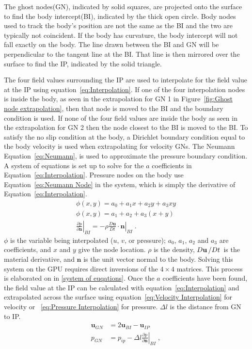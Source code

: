 \documentclass[onehalf,11pt]{beavtex}
\begin{document}
The ghost nodes(GN), indicated by solid squares, are projected onto the surface to find the body intercept(BI), indicated by the thick open circle.
Body nodes used to track the body's position are not the same as the BI and the two are typically not coincident.
If the body has curvature, the body intercept will not fall exactly on the body.
The line drawn between the BI and GN will be perpendicular to the tangent line at the BI.
That line is then mirrored over the surface to find the IP, indicated by the solid triangle. 

The four field values surrounding the IP are used to interpolate for the field value at the IP using equation~\eqref{eq:Interpolation}. 
If one of the four interpolation nodes is inside the body, as seen in the extrapolation for GN 1 in Figure~\ref{fig:Ghost node extrapolation}, then that node is moved to the BI and the boundary condition is used.
If none of the four field values are inside the body as seen in the extrapolation for GN 2 then the node closest to the BI is moved to the BI.
To satisfy the no slip condition at the body, a Dirichlet boundary condition equal to the body velocity is used when extrapolating for velocity GNs. 
The Neumann Equation~\eqref{eq:Neumann}, is used to approximate the pressure boundary condition.
A system of equations is set up to solve for the $a$ coefficients in Equation~\eqref{eq:Interpolation}.
Pressure nodes on the body use Equation~\eqref{eq:Neumann Node} in the system, which is simply the derivative of Equation~\eqref{eq:Interpolation}. 
\begin{align}
\phi (x,y) = a_0 + a_1 x + a_2y + a_3 x y \label{eq:Interpolation} \\
\phi (x,y) = a_1 + a_2 + a_3 (x+y) \label{eq:Neumann Node} \\
\left. \frac{\partial p}{\partial \textbf{n}}\right|_{BI} = \left. -\rho \frac{D\textbf{u}}{Dt}\cdot \textbf{n}\right|_{BI}
\label{eq:Neumann}\;.
\end{align}
$\phi$ is the variable being interpolated ($u$, $v$, or pressure); $a_0$, $a_1$, $a_2$ and $a_3$ are coefficients, and $x$ and $y$ give the node location.
$\rho$ is the density, $D\textbf{u}\left/Dt\right.$ is the material derivative, and $\textbf{n}$ is the unit vector normal to the body.
Solving this system on the GPU requires direct inversions of the $4 \times 4$ matrices.
This process is elaborated on in \ref{system of euqations}.
Once the $a$ coefficients have been found, the field value at the IP can be calculated with equation~\eqref{eq:Interpolation} and extrapolated across the surface using equation~\eqref{eq:Velocity Interpolation} for velocity or ~\eqref{eq:Pressure Interpolation} for pressure. 
$\Delta l$ is the distance from GN to IP.
\begin{align}
\textbf{u}_{GN} &= 2\textbf{u}_{BI} - \textbf{u}_{IP} \label{eq:Velocity Interpolation} \\
p_{GN} &= p_{ip} - \Delta l \left. \frac{\partial p}{\partial \textbf{n}}\right|_{BI} \;, \label{eq:Pressure Interpolation}
\end{align}
\end{document}
